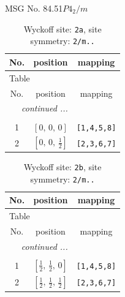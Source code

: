 \documentclass[fleqn,8pt]{jsarticle}
\begin{document}
\setcounter{MaxMatrixCols}{32}

\renewcommand{\tablename}{Table~}
\renewcommand{\figurename}{Figure~}
\begin{center}
\LARGE
MSG No. 84.51\quad$P4_{2}/m$
\end{center}
\renewcommand{\arraystretch}{1.2}
\begin{longtable}{ccc}
\caption{Wyckoff site: {\tt 2a}, site symmetry: {\tt 2/m..}}
 \\
 \hline \hline
No. & position & mapping \\ \hline \endfirsthead

\multicolumn{2}{l}{\tablename\ \thetable{}} \\
 \hline \hline
No. & position & mapping \\ \hline \endhead

 \hline \hline
\multicolumn{2}{r}{\footnotesize\it continued ...} \\ \endfoot

 \hline \hline
\multicolumn{2}{r}{} \\ \endlastfoot

1 & $\left[ 0,\, 0,\, 0 \right]$ & {\tt [1,4,5,8]} \\ \hline
2 & $\left[ 0,\, 0,\, \frac{1}{2} \right]$ & {\tt [2,3,6,7]} \\
\end{longtable}
\renewcommand{\arraystretch}{1.2}
\begin{longtable}{ccc}
\caption{Wyckoff site: {\tt 2b}, site symmetry: {\tt 2/m..}}
 \\
 \hline \hline
No. & position & mapping \\ \hline \endfirsthead

\multicolumn{2}{l}{\tablename\ \thetable{}} \\
 \hline \hline
No. & position & mapping \\ \hline \endhead

 \hline \hline
\multicolumn{2}{r}{\footnotesize\it continued ...} \\ \endfoot

 \hline \hline
\multicolumn{2}{r}{} \\ \endlastfoot

1 & $\left[ \frac{1}{2},\, \frac{1}{2},\, 0 \right]$ & {\tt [1,4,5,8]} \\ \hline
2 & $\left[ \frac{1}{2},\, \frac{1}{2},\, \frac{1}{2} \right]$ & {\tt [2,3,6,7]} \\
\end{longtable}
\end{document}
